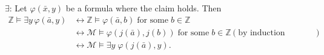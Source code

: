 \documentclass{article}
\begin{document}
\begin{enumerate}
    $\exists$: Let $\varphi(\bar{x},y)$ be a formula where the claim holds.
    Then
    \begin{align*}
      \mathbb{Z}\models\exists y\, \varphi(\bar{a},y)
        &\leftrightarrow\mathbb{Z}\models\varphi(\bar{a},b)\; \text{for
        some}\; b\in\mathbb{Z} & \\
        &\leftrightarrow\mathcal{M}\models\varphi(j(\bar{a}),j(b))\;
        \text{for some}\; b\in\mathbb{Z}& (\text{by induction hypothesis})
        \\
        &\leftrightarrow\mathcal{M}\models\exists y\; \varphi(j(\bar{a}),y). & \\
    \end{align*}
\end{enumerate}
\end{document}
